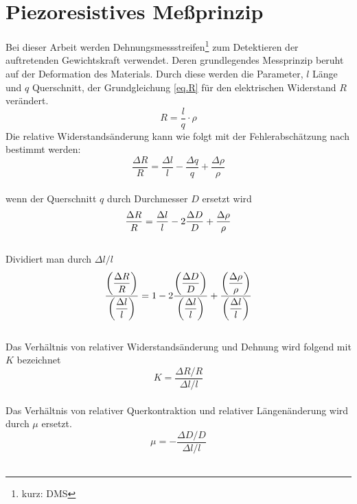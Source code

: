 \documentclass[12pt]{scrreprt} %
\begin{document}
\section{Piezoresistives Meßprinzip}
Bei dieser Arbeit werden Dehnungsmessstreifen\footnote{kurz: DMS} zum Detektieren der auftretenden Gewichtskraft verwendet. Deren grundlegendes Messprinzip beruht auf der Deformation des Materials. Durch diese werden die Parameter, $l$ Länge und $q$ Querschnitt, der Grundgleichung \vref{eq.R} für den elektrischen Widerstand $R$ verändert. 
\begin{equation}
R = \frac{l}{q}\cdot \rho \label{eq.R}
\end{equation}
Die relative Widerstandsänderung kann wie folgt mit der Fehlerabschätzung nach \citep[S.234 ff.]{Schruefer2012} bestimmt werden:\\
\begin{equation}
\frac{\Delta R} {R} =\frac{\Delta l} {l}-\frac{\Delta q} {q}+\frac{\Delta \rho} {\rho}
\end{equation}\\
wenn der Querschnitt $q$ durch Durchmesser $D$ ersetzt wird\\
\begin{equation}
\frac{\Delta R} {R} =\frac{\Delta l} {l}-2\frac{\Delta D} {D}+\frac{\Delta \rho} {\rho}\\
\end{equation}\\
Dividiert man durch $\Delta l/ l$\\
\begin{equation}
\frac{\displaystyle\left(\frac{\Delta R} {R}\right)}{\displaystyle\left(\frac{\Delta l} {l}\right)} =1-2\frac{\displaystyle\left(\frac{\Delta D} {D}\right)}{\displaystyle\left(\frac{\Delta l} {l}\right)}+\frac{\displaystyle\left(\frac{\Delta \rho} {\rho}\right)}{\displaystyle\left(\frac{\Delta l} {l}\right)} \label{eq.R+}\\
\end{equation}\\
Das Verhältnis von relativer Widerstandsänderung und Dehnung wird folgend mit $K$ bezeichnet\\
\begin{equation}
K=\frac{\Delta R/ R}{\Delta l/ l}
\end{equation}\\
Das Verhältnis von relativer Querkontraktion und relativer Längenänderung wird durch $\mu$ ersetzt.\\
\begin{equation}
\mu=-\frac{\Delta D / D}{\Delta l / l}
\end{equation}\\
\end{document}
